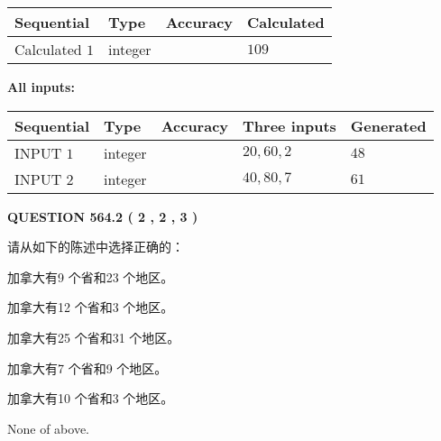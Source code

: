 \documentclass{ctexart}
\begin{document}
   
   
   
\noindent{}
   
   
  
  
\noindent\begin{tabular}{|l|l|l|l|}
\hline
 Sequential & Type & Accuracy & Calculated \\ 
\hline
 
 
  Calculated $  1 $ & integer &  & 
  $ 109 $ 
 \\  \hline  
 \end{tabular}
   
   
   
   
\noindent\vspace{0.1in}\hspace{-0.08in} {\textbf{\Large{All inputs: }}}
   
   
  
  
\noindent\begin{tabular}{|l|l|l|l|l|}
\hline
 Sequential & Type & Accuracy & Three inputs & Generated \\ 
\hline
 
 
  INPUT $  1 $ & integer &  & $
 20
 , 
 60
 , 
 2
 $ & $ 48 $ 
 \\  \hline  
 
 
  INPUT $  2 $ & integer &  & $
 40
 , 
 80
 , 
 7
 $ & $ 61 $ 
 \\  \hline  
 \end{tabular}
   
   
  
\vspace{0.2in}
  
{\textbf{\Large{QUESTION
564.2 
 ( 2 , 2 , 3 )
}}}
  
  
请从如下的陈述中选择正确的：
 
 
加拿大有9 个省和23 个地区。
 
 
加拿大有12 个省和3 个地区。
 
 
加拿大有25 个省和31 个地区。
 
 
加拿大有7 个省和9 个地区。
 
 
加拿大有10 个省和3 个地区。
 
 
 None of above.
 
 
\noindent{}
 
\end{document}
